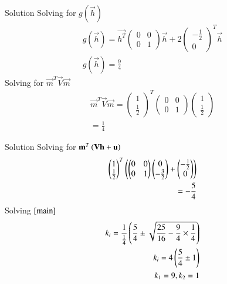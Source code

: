 \documentclass{beamer}
\begin{document}
\begin{frame}{Solution}
Solving for $g(\vec{h})$
\begin{align}
    g(\vec{h})=\vec{h^T}\begin{pmatrix}0&0\\0&1\end{pmatrix}\vec{h}+2\begin{pmatrix}-\frac{1}{2}\\0\end{pmatrix}^T\vec{h}\\
    g(\vec{h})=\frac{9}{4} \label{g}
\end{align}
Solving for $\vec{m}^T\vec{V}\vec{m}$
\begin{align}
    \vec{m}^T\vec{V}\vec{m}=\begin{pmatrix}1 \\ \frac{1}{2}\end{pmatrix}^T\begin{pmatrix}0&0\\0&1\end{pmatrix}\begin{pmatrix}1 \\ \frac{1}{2}\end{pmatrix}\\
    =\frac{1}{4}\label{mv}
\end{align}
\end{frame}
\begin{frame}{Solution}
Solving for $\mathbf{m}^T\left(\mathbf{V}\mathbf{h}+\mathbf{u}\right)$
\begin{align}
    \begin{pmatrix}1 \\ \frac{1}{2}\end{pmatrix}^T\left(\begin{pmatrix}0&0\\0&1\end{pmatrix}\begin{pmatrix}0\\-\frac{3}{2}\end{pmatrix}+\begin{pmatrix}-\frac{1}{2}\\0\end{pmatrix}\right)\\
    =-\frac{5}{4}
\end{align}
Solving $\eqref{main}$
\begin{align}
    k_i=\frac{1}{\frac{1}{4}}\left(\frac{5}{4} \pm \sqrt{\frac{25}{16} - \frac{9}{4}\times \frac{1}{4}}\right)\\
    k_i=4\left(\frac{5}{4} \pm 1\right)\\
    k_1=9,k_2=1
\end{align}
\end{frame}
\end{document}
